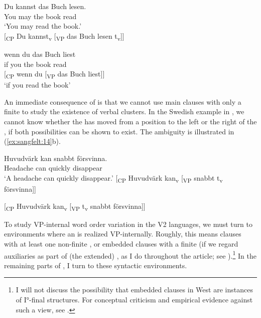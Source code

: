 \documentclass[output=paper, colorlinks, citecolor=brown]{langscibook}
\begin{document}
\ea {}\label{ex:sangfelt:13}
\ea\label{ex:sangfelt:13a}
\gll Du kannst das Buch lesen.\\
 You may the book read\\
\glt ‘You may read the book.’\\

[\textsubscript{CP} Du kannst\textsubscript{v} [\textsubscript{VP} {das} {Buch} lesen t\textsubscript{v}]]

\ex\label{ex:sangfelt:13b}
\gll wenn du das Buch liest \\
 if you the book read\\

[\textsubscript{CP} wenn du [\textsubscript{VP} {das} {Buch} liest]]\\

\glt ‘if you read the book’
\z 
\z 

An immediate consequence of    is that we cannot use main clauses with only a finite  to study the existence of verbal clusters. In the Swedish example in , we cannot know whether the  has moved from a position to the left or the right of the , if both possibilities can be shown to exist. The ambiguity is illustrated in (\ref{ex:sangfelt:14}b).

\ea {}\label{ex:sangfelt:14}
\ea \label{ex:sangfelt:14a}
\gll Huvudvärk kan {snabbt} försvinna.  \\
 Headache can quickly disappear \\
\glt ‘A headache can quickly disappear.’
\ex\label{ex:sangfelt:14b}
[\textsubscript{CP} Huvudvärk kan\textsubscript{v} [\textsubscript{VP} snabbt t\textsubscript{v} försvinna]]

[\textsubscript{CP} Huvudvärk kan\textsubscript{v} [\textsubscript{VP} t\textsubscript{v} snabbt försvinna]]
\z 
\z

To study VP-internal word order variation in the  V2 languages, we must turn to environments where an  is realized VP-internally. Roughly, this means clauses with at least one non-finite , or embedded clauses with a finite  (if we regard auxiliaries as part of (the extended) , as I do throughout the article; see ).\footnote{I will not discuss the possibility that embedded clauses in West  are instances of I°-final structures. For conceptual criticism and empirical evidence against such a view, see \citet[54–68]{Haider2010}.} In the remaining parts of , I turn to these syntactic environments.
\end{document}
